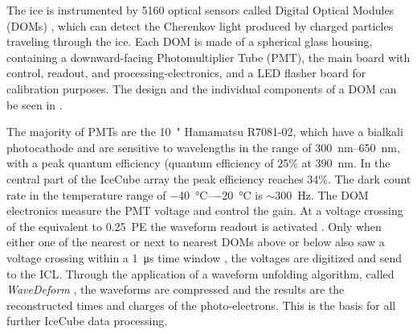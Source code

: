 

The ice is instrumented by 5160 optical sensors called Digital Optical Modules (DOMs) , which can detect the Cherenkov light produced by charged particles traveling through the ice. Each DOM is made of a spherical glass housing, containing a downward-facing Photomultiplier Tube (PMT), the main board with control, readout, and processing-electronics, and a LED flasher board for calibration purposes. The design and the individual components of a DOM can be seen in .

The majority of PMTs are the \SI{10}{"} Hamamatsu R7081-02, which have a bialkali photocathode and are sensitive to wavelengths in the range of \SIrange{300}{650}{\nano\metre}, with a peak quantum efficiency (quantum efficiency  of 25\% at \SI{390}{\nano\metre}. In the central part of the IceCube array the peak efficiency reaches 34\%. The dark count rate in the temperature range of \SIrange{-40}{-20}{\degreeCelsius} is $\sim$\SI{300}{\hertz}. The DOM electronics measure the PMT voltage and control the gain. At a voltage crossing of the equivalent to \SI{0.25}{PE} the waveform readout is activated . Only when either one of the nearest or next to nearest DOMs above or below also saw a voltage crossing within a \SI{1}{\micro\second} time window , the voltages are digitized and send to the ICL. Through the application of a waveform unfolding algorithm, called \textit{WaveDeform} , the waveforms are compressed and the results are the reconstructed times and charges of the photo-electrons. This is the basis for all further IceCube data processing.

